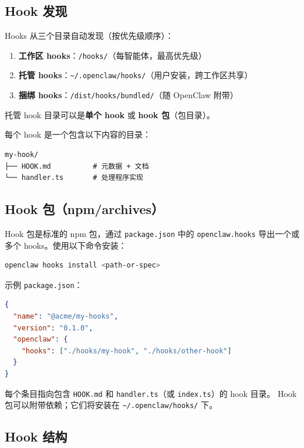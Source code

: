 \subsection{Hook 发现}


Hooks 从三个目录自动发现（按优先级顺序）：

\begin{enumerate}
  \item \textbf{工作区 hooks}：\texttt{/hooks/}（每智能体，最高优先级）
  \item \textbf{托管 hooks}：\texttt{\textasciitilde{}/.openclaw/hooks/}（用户安装，跨工作区共享）
  \item \textbf{捆绑 hooks}：\texttt{/dist/hooks/bundled/}（随 OpenClaw 附带）
\end{enumerate}


托管 hook 目录可以是\textbf{单个 hook} 或 \textbf{hook 包}（包目录）。

每个 hook 是一个包含以下内容的目录：

\begin{lstlisting}
my-hook/
├── HOOK.md          # 元数据 + 文档
└── handler.ts       # 处理程序实现
\end{lstlisting}


\subsection{Hook 包（npm/archives）}


Hook 包是标准的 npm 包，通过 \texttt{package.json} 中的 \texttt{openclaw.hooks} 导出一个或多个 hooks。使用以下命令安装：

\begin{lstlisting}[language=bash]
openclaw hooks install <path-or-spec>
\end{lstlisting}


示例 \texttt{package.json}：

\begin{lstlisting}[language=json]
{
  "name": "@acme/my-hooks",
  "version": "0.1.0",
  "openclaw": {
    "hooks": ["./hooks/my-hook", "./hooks/other-hook"]
  }
}
\end{lstlisting}


每个条目指向包含 \texttt{HOOK.md} 和 \texttt{handler.ts}（或 \texttt{index.ts}）的 hook 目录。
Hook 包可以附带依赖；它们将安装在 \texttt{\textasciitilde{}/.openclaw/hooks/} 下。

\subsection{Hook 结构}



